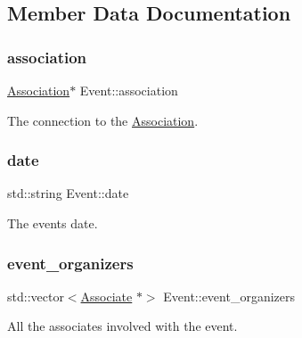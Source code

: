 \subsection{Member Data Documentation}
\mbox{\label{classEvent_a3c8694833e50dbd2e37943eff1f5c9b1}} 
\subsubsection{\texorpdfstring{association}{association}}
{\footnotesize\ttfamily \mbox{\hyperlink{classAssociation}{Association}}$\ast$ Event\+::association\hspace{0.3cm}{\ttfamily [protected]}}



The connection to the \mbox{\hyperlink{classAssociation}{Association}}. 

\mbox{\label{classEvent_a9a93c9d38211f84cd6e347690e177f11}} 
\subsubsection{\texorpdfstring{date}{date}}
{\footnotesize\ttfamily std\+::string Event\+::date\hspace{0.3cm}{\ttfamily [protected]}}



The event\textquotesingle{}s date. 

\mbox{\label{classEvent_ad35e04c759fdbfad75aed0b6e2eef63c}} 
\subsubsection{\texorpdfstring{event\+\_\+organizers}{event\_organizers}}
{\footnotesize\ttfamily std\+::vector$<$\mbox{\hyperlink{classAssociate}{Associate}} $\ast$$>$ Event\+::event\+\_\+organizers\hspace{0.3cm}{\ttfamily [protected]}}



All the associates involved with the event. 

\mbox{\label{classEvent_a6cec387dca85f0a0e8419cfc94eb320e}} 
